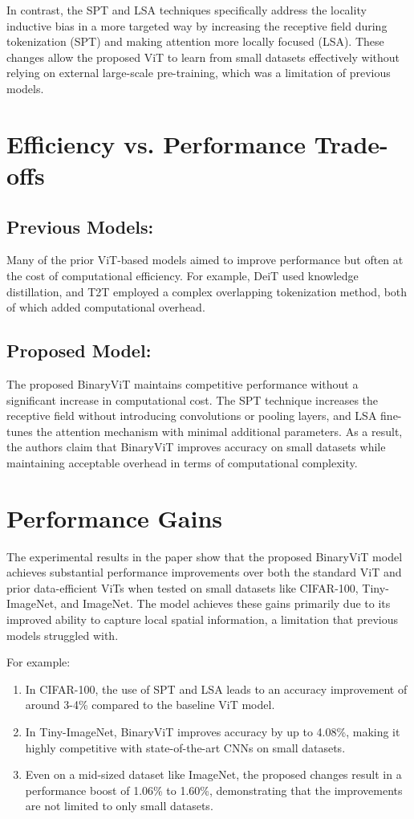 \documentclass{report}
\begin{document}
	In contrast, the SPT and LSA techniques specifically address the locality inductive bias in a more targeted way by increasing the receptive field during tokenization (SPT) and making attention more locally focused (LSA). These changes allow the proposed ViT to learn from small datasets effectively without relying on external large-scale pre-training, which was a limitation of previous models.
	
	
	
	\section{Efficiency vs. Performance Trade-offs}
	\subsection{Previous Models:}
	Many of the prior ViT-based models aimed to improve performance but often at the cost of computational efficiency. For example, DeiT used knowledge distillation, and T2T employed a complex overlapping tokenization method, both of which added computational overhead.
	
	
	\subsection{Proposed Model:}
	The proposed BinaryViT maintains competitive performance without a significant increase in computational cost. The SPT technique increases the receptive field without introducing convolutions or pooling layers, and LSA fine-tunes the attention mechanism with minimal additional parameters. As a result, the authors claim that BinaryViT improves accuracy on small datasets while maintaining acceptable overhead in terms of computational complexity.
	
	
	\section{Performance Gains}
	The experimental results in the paper show that the proposed BinaryViT model achieves substantial performance improvements over both the standard ViT and prior data-efficient ViTs when tested on small datasets like CIFAR-100, Tiny-ImageNet, and ImageNet. The model achieves these gains primarily due to its improved ability to capture local spatial information, a limitation that previous models struggled with.
	
	For example:
	\begin{enumerate}
		\item 
		In CIFAR-100, the use of SPT and LSA leads to an accuracy improvement of around 3-4\% compared to the baseline ViT model.
		
		\item 
		In Tiny-ImageNet, BinaryViT improves accuracy by up to 4.08\%, making it highly competitive with state-of-the-art CNNs on small datasets.
		
		\item 
		Even on a mid-sized dataset like ImageNet, the proposed changes result in a performance boost of 1.06\% to 1.60\%, demonstrating that the improvements are not limited to only small datasets.
	\end{enumerate}
	
\end{document}
